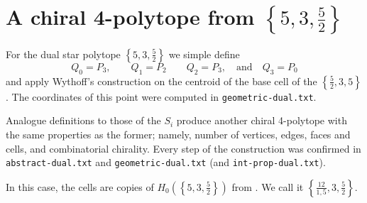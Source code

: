 \documentclass{article}
\theoremstyle{definition}
\begin{document}
	
	\section{A chiral 4-polytope from $\left\{5,3,\frac{5}{2}\right\}$}
	For the dual star polytope $\left\{5,3,\frac{5}{2}\right\}$ we simple define
	\[Q_0=P_3,\qquad Q_1=P_2\qquad Q_2=P_3,\quad\text{and}\quad Q_3=P_0\]
	and apply Wythoff's construction on the centroid of the base cell of the $\left\{\frac{5}{2},3,5\right\}$. The coordinates of this point were computed in \texttt{geometric-dual.txt}.
	
	Analogue definitions to those of the $S_i$ produce another chiral 4-polytope with the same properties as the former; namely, number of vertices, edges, faces and cells, and combinatorial chirality. Every step of the construction was confirmed in \texttt{abstract-dual.txt} and \texttt{geometric-dual.txt} (and \texttt{int-prop-dual.txt}).
	
	In this case, the cells are copies of $H_0(\left\{5,3,\frac{5}{2}\right\})$ from \cite{petcox}. We call it $\left\{\frac{12}{1,5},3,\frac{5}{2}\right\}$.
	
\end{document}
